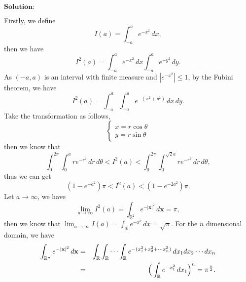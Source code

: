 \documentclass[12pt]{article}
\begin{document}
\vspace{8pt}

$\textbf{Solution:}$

Firstly, we define 
\begin{equation*}
    I(a) = \int_{-a}^{a} e^{- x^{2}} \, d x,
\end{equation*}
then we have
\begin{equation*}
    I^{2}(a) = \int_{-a}^{a} e^{- x^{2}} \, d x \int_{-a}^{a} e^{- y^{2}} \, d y.
\end{equation*}
As $(-a, a)$ is an interval with finite measure and $|e^{-x^{2}}| \leq 1$, by the Fubini theorem, we have
\begin{equation*}
    I^{2}(a) = \int_{-a}^{a} \int_{-a}^{a} e^{- (x^{2}+y^{2})} \, d x \, d y.
\end{equation*}
Take the transformation as follows,
\begin{equation*}
\left\{
             \begin{array}{cl}
             x = r \cos \theta \\
             y = r \sin \theta 
             \end{array}
\right.
\end{equation*}
then we know that
\begin{equation*}
    \int_{0}^{2 \pi} \int_{0}^{a} r e^{-r^{2}} \, d r\, d \theta < I^{2}(a) < \int_{0}^{2 \pi} \int_{0}^{\sqrt{2} a} r e^{-r^{2}}  \, d r \, d \theta,
\end{equation*}
thus we can get
\begin{equation*}
    (1 - e^{- a^{2}}) \pi < I^{2}(a) < (1 - e^{- 2a^{2}}) \pi .
\end{equation*}
Let $a \to \infty$, we have \begin{equation*}
    \lim_{a \to \infty} I^{2}(a) = \int_{\mathbb{R}^{2}}^{} e^{- |\textbf{x}|^{2}} \, d \textbf{x} = \pi,
\end{equation*}
then we know that $\lim_{a \to \infty} I(a) = \int_{\mathbb{R}}^{} e^{- x^{2}} \, d x = \sqrt{\pi}$. For the $n$ dimensional domain, we have
\begin{eqnarray*}
    \int_{\mathbb{R}^{n}}^{} e^{- |\textbf{x}|^{2}} \, d \textbf{x} & = & \int_{\mathbb{R}}^{} \int_{\mathbb{R}}^{} \cdots \int_{\mathbb{R}}^{} e^{- (x_{1}^{2} + x_{2}^{2} + \cdots x_{n}^{2})} \, d x_{1} d x_{2} \cdots d x_{n} \\
    & = & \Big{(} \int_{\mathbb{R}}^{} e^{- x_{1}^{2} } \, d x_{1} \Big{)}^{n} = \pi^{\frac{n}{2}}.
\end{eqnarray*}
\end{document}
